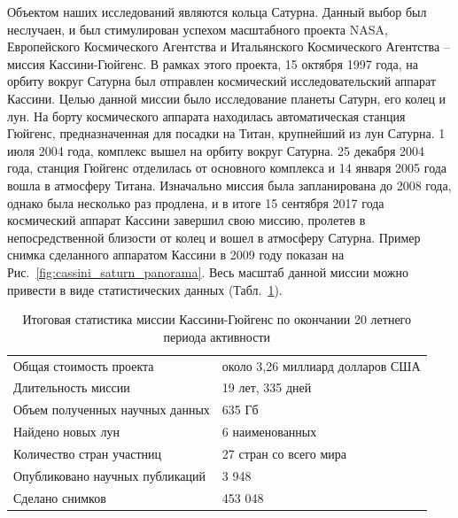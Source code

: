 Объектом наших исследований являются кольца Сатурна. 
Данный выбор был неслучаен, и был стимулирован успехом масштабного проекта NASA, Европейского Космического Агентства и Итальянского
Космического Агентства -- миссия Кассини-Гюйгенс. В рамках этого проекта, 15 октября 1997 года, на орбиту вокруг Сатурна был отправлен космический
исследовательский аппарат Кассини. Целью данной миссии было исследование планеты Сатурн, его колец и лун. На борту космического аппарата находилась
автоматическая станция Гюйгенс, предназначенная для посадки на Титан, крупнейший из лун Сатурна. 1 июля 2004 года, комплекс вышел на орбиту вокруг Сатурна.
25 декабря 2004 года, станция Гюйгенс отделилась от основного комплекса и 14 января 2005 года вошла в атмосферу Титана. Изначально миссия была 
запланирована до 2008 года, однако была несколько раз продлена, и в итоге 15 сентября 2017 года космический аппарат Кассини завершил свою миссию,
пролетев в непосредственной близости от колец и вошел в атмосферу Сатурна. 
Пример снимка сделанного аппаратом Кассини в 2009 году показан на Рис.~\ref{fig:cassini_saturn_panorama}.
Весь масштаб данной миссии можно привести в виде статистических данных 
(Табл.~\ref{tab:cassini_mission}). 
\begin{table}[ht]    
    \caption{Итоговая статистика миссии Кассини-Гюйгенс по окончании 20 летнего периода активности}
    \begin{tabular}{|l|l|}
    \hline    
        Общая стоимость проекта             & около 3,26 миллиард долларов США  \\
        Длительность миссии                 & 19 лет, 335 дней                  \\
        Объем полученных научных данных     & 635 Гб                            \\
        Найдено новых лун                   & 6 наименованных                   \\
        Количество стран участниц           & 27 стран со всего мира            \\
        Опубликовано научных публикаций     & 3 948                             \\
        Сделано снимков                     & 453 048                           \\
    \hline    
    \end{tabular}
    \label{tab:cassini_mission}
\end{table}

